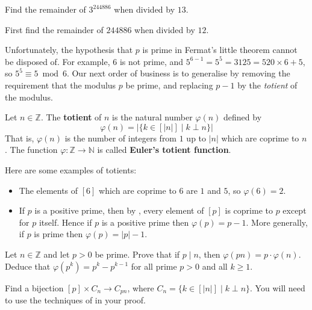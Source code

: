 \begin{exercise}
\label{RemainderOfThreeExpBigRemThirteen}
Find the remainder of $3^{244886}$ when divided by $13$.
\begin{backhint}
First find the remainder of $244886$ when divided by $12$.
\end{backhint}
\end{exercise}

Unfortunately, the hypothesis that $p$ is prime in Fermat's little theorem cannot be disposed of. For example, $6$ is not prime, and $5^{6-1} = 5^5 = 3125 = 520 \times 6 + 5$, so $5^5 \equiv 5 \bmod 6$. Our next order of business is to generalise  by removing the requirement that the modulus $p$ be prime, and replacing $p-1$ by the \textit{totient} of the modulus.

\begin{definition}
\label{defTotient}
Let $n \in \mathbb{Z}$. The \textbf{totient} of $n$ is the natural number $\varphi(n)$  defined by
\[ \varphi(n) = | \{ k \in [ |n| ] \mid k \perp n \}| \]
That is, $\varphi(n)$ is the number of integers from $1$ up to $|n|$ which are coprime to $n$. The function $\varphi : \mathbb{Z} \to \mathbb{N}$ is called \textbf{Euler's totient function}.
\end{definition}

\begin{example}
\label{exComputationsOfTotients}
Here are some examples of totients:
\begin{itemize}
\item The elements of $[6]$ which are coprime to $6$ are $1$ and $5$, so $\varphi(6)=2$.
\item If $p$ is a positive prime, then by , every element of $[p]$ is coprime to $p$ except for $p$ itself. Hence if $p$ is a positive prime then $\varphi(p)=p-1$. More generally, if $p$ is prime then $\varphi(p) = |p|-1$.
\end{itemize}
\end{example}

\begin{exercise}
\label{exTotientMultiplyByPrime}
Let $n \in \mathbb{Z}$ and let $p > 0$ be prime. Prove that if $p \mid n$, then $\varphi(pn) = p \cdot \varphi(n)$. Deduce that $\varphi(p^k) = p^k-p^{k-1}$ for all prime $p>0$ and all $k \ge 1$.
\begin{backhint}
Find a bijection $[p] \times C_n \to C_{pn}$, where $C_n = \{ k \in [|n|] \mid k \perp n \}$. You will need to use the techniques of  in your proof.
\end{backhint}
\end{exercise}

